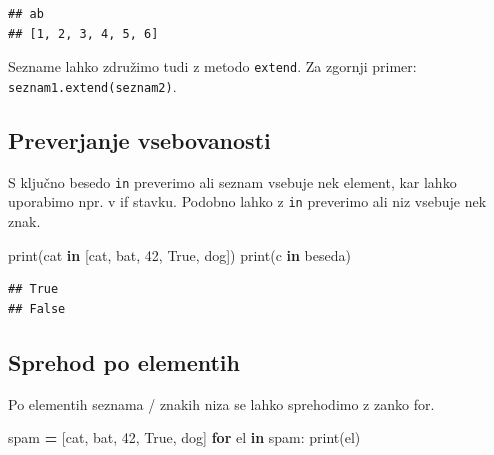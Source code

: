 \documentclass[
]{book}
\newenvironment{Shaded}{\begin{snugshade}}{\end{snugshade}}
\newcommand{\BuiltInTok}[1]{#1}
\newcommand{\ControlFlowTok}[1]{\textcolor[rgb]{0.13,0.29,0.53}{\textbf{#1}}}
\newcommand{\DecValTok}[1]{\textcolor[rgb]{0.00,0.00,0.81}{#1}}
\newcommand{\KeywordTok}[1]{\textcolor[rgb]{0.13,0.29,0.53}{\textbf{#1}}}
\newcommand{\NormalTok}[1]{#1}
\newcommand{\OperatorTok}[1]{\textcolor[rgb]{0.81,0.36,0.00}{\textbf{#1}}}
\newcommand{\StringTok}[1]{\textcolor[rgb]{0.31,0.60,0.02}{#1}}
\newcommand{\VariableTok}[1]{\textcolor[rgb]{0.00,0.00,0.00}{#1}}
\begin{document}
\begin{verbatim}
## ab
## [1, 2, 3, 4, 5, 6]
\end{verbatim}

Sezname lahko združimo tudi z metodo \texttt{extend}. Za zgornji primer: \texttt{seznam1.extend(seznam2)}.

\hypertarget{preverjanje-vsebovanosti}{%
\subsection{Preverjanje vsebovanosti}\label{preverjanje-vsebovanosti}}

S ključno besedo \texttt{in} preverimo ali seznam vsebuje nek element, kar lahko uporabimo npr. v if stavku. Podobno lahko z \texttt{in} preverimo ali niz vsebuje nek znak.

\begin{Shaded}
\begin{Highlighting}[]
\BuiltInTok{print}\NormalTok{(}\StringTok{\textquotesingle{}cat\textquotesingle{}} \KeywordTok{in}\NormalTok{ [}\StringTok{\textquotesingle{}cat\textquotesingle{}}\NormalTok{, }\StringTok{\textquotesingle{}bat\textquotesingle{}}\NormalTok{, }\DecValTok{42}\NormalTok{, }\VariableTok{True}\NormalTok{, }\StringTok{\textquotesingle{}dog\textquotesingle{}}\NormalTok{])}
\BuiltInTok{print}\NormalTok{(}\StringTok{\textquotesingle{}c\textquotesingle{}} \KeywordTok{in} \StringTok{\textquotesingle{}beseda\textquotesingle{}}\NormalTok{)}
\end{Highlighting}
\end{Shaded}

\begin{verbatim}
## True
## False
\end{verbatim}

\hypertarget{sprehod-po-elementih}{%
\subsection{Sprehod po elementih}\label{sprehod-po-elementih}}

Po elementih seznama / znakih niza se lahko sprehodimo z zanko for.

\begin{Shaded}
\begin{Highlighting}[]
\NormalTok{spam }\OperatorTok{=}\NormalTok{ [}\StringTok{\textquotesingle{}cat\textquotesingle{}}\NormalTok{, }\StringTok{\textquotesingle{}bat\textquotesingle{}}\NormalTok{, }\DecValTok{42}\NormalTok{, }\VariableTok{True}\NormalTok{, }\StringTok{\textquotesingle{}dog\textquotesingle{}}\NormalTok{]}
\ControlFlowTok{for}\NormalTok{ el }\KeywordTok{in}\NormalTok{ spam:}
    \BuiltInTok{print}\NormalTok{(el)}
\end{Highlighting}
\end{Shaded}
\end{document}
